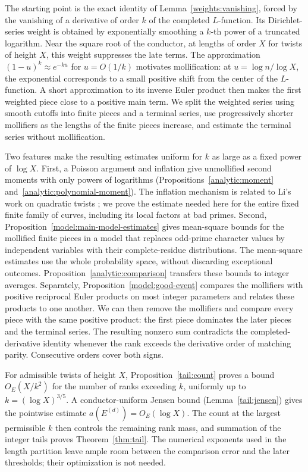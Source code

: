 The starting point is the exact identity of Lemma~\ref{weights:vanishing},
forced by the vanishing of a derivative of order \(k\) of the completed \(L\)-function.
Its Dirichlet-series weight is obtained by exponentially smoothing
a \(k\)-th power of a truncated logarithm.
Near the square root of the conductor, at lengths of order \(X\) for
twists of height \(X\), this weight suppresses the late terms.
The approximation \((1-u)^k\approx e^{-ku}\) for \(u=O(1/k)\)
motivates mollification: at \(u=\log n/\log X\), the exponential
corresponds to a small positive shift from the center of the
\(L\)-function. A short approximation to its inverse Euler product
then makes the first weighted piece close to a positive main term.
We split the weighted series using smooth cutoffs into finite pieces
and a terminal series, use progressively shorter mollifiers as the
lengths of the finite pieces increase, and estimate the terminal series
without mollification.

Two features make the resulting estimates uniform for
\(k\) as large as a fixed power of \(\log X\).
First, a Poisson argument and inflation give unmollified second moments
with only powers of logarithms
(Propositions~\ref{analytic:moment} and~\ref{analytic:polynomial-moment}).
The inflation mechanism is related
to Li's work on quadratic twists
\cite[Lemmas~2.7 and~3.1, Proposition~3.2]{Li2022}; we prove the estimate
needed here for the entire fixed finite family of curves, including its
local factors at bad primes.
Second, Proposition~\ref{model:main-model-estimates} gives mean-square
bounds for the mollified finite pieces in a model that replaces
odd-prime character values by independent variables with their
complete-residue distributions. The mean-square estimates use the whole
probability space, without discarding exceptional outcomes.
Proposition~\ref{analytic:comparison} transfers these bounds to integer averages.
Separately, Proposition~\ref{model:good-event} compares the mollifiers
with positive reciprocal Euler products on most integer parameters
and relates these products to one another. We can then remove the
mollifiers and compare every piece with the same positive product:
the first piece dominates the later pieces and
the terminal series. The resulting nonzero sum contradicts the
completed-derivative identity whenever the rank exceeds the derivative
order of matching parity. Consecutive orders cover both signs.

For admissible twists of height \(X\), Proposition~\ref{tail:count} proves a bound
\(O_E(X/k^2)\) for the number of ranks exceeding \(k\), uniformly up to
\(k=(\log X)^{3/5}\).
A conductor-uniform Jensen bound (Lemma~\ref{tail:jensen}) gives the pointwise estimate
\(a(E^{(d)})=O_E(\log X)\).
The count at the largest permissible \(k\) then controls the remaining
rank mass, and summation of the integer tails proves
Theorem~\ref{thm:tail}.
The numerical exponents used in the length partition leave ample
room between the comparison error and the later thresholds; their
optimization is not needed.

